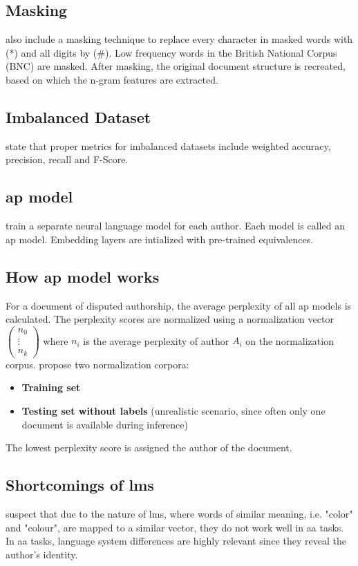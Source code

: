 \subsection{Masking}
\label{sec:topic_confusion_masking}
\citet{altakrori_topic_2021} also include a masking technique to replace every character in masked words with (*) and all digits by (\#).
Low frequency words in the British National Corpus (BNC) are masked.
After masking, the original document structure is recreated, based on which the n-gram features are extracted.

\subsection{Imbalanced Dataset}
\label{sec:topic_confusion_imbalanced_dataset}
\citet{altakrori_topic_2021} state that proper metrics for imbalanced datasets include 
weighted accuracy, precision, recall and F-Score.


\subsection{\ac{ap} model}
\label{sec:topic_confusion_ap_model}
\citet{altakrori_topic_2021} train a separate neural language model for each author.
Each model is called an \ac{ap} model.
Embedding layers are intialized with pre-trained equivalences.

\subsection{How \ac{ap} model works}
\label{sec:topic_confusion_ap_model_works}
For a document of disputed authorship, the average perplexity of all \ac{ap} models is calculated.
The perplexity scores are normalized using a normalization vector $\begin{pmatrix}
    n_0
     \\\vdots 
     \\n_k
    
    \end{pmatrix}$
where $n_i$ is the average perplexity of author $A_i$ on the normalization corpus.
\citet{altakrori_topic_2021} propose two normalization corpora:
\begin{itemize}
    \item \textbf{Training set}
    \item \textbf{Testing set without labels} (unrealistic scenario, since often only one document is available during inference)
\end{itemize}
The lowest perplexity score is assigned the author of the document.

\subsection{Shortcomings of \acp{lm}}
\label{sec:topic_confusion_shortcomings_lm}
\citet{altakrori_topic_2021} suspect that due to the nature of \acp{lm}, where words of similar meaning, i.e. "color" and "colour", 
are mapped to a similar vector, they do not work well in \ac{aa} tasks.
In \ac{aa} tasks, language system differences are highly relevant since they reveal the author's identity.  